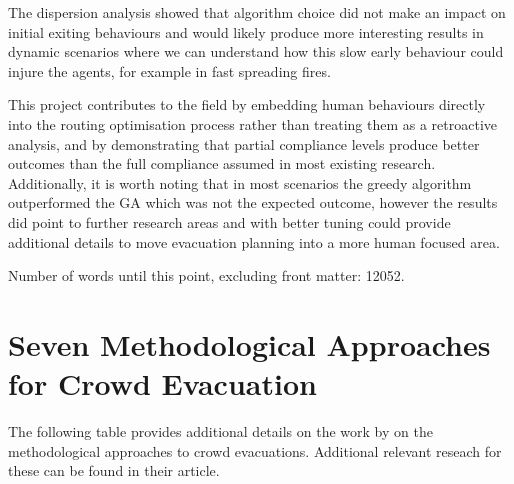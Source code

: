 \documentclass[12pt,a4paper]{report}
\begin{document}
The dispersion analysis showed that algorithm choice did not make an impact on initial exiting behaviours and would likely produce more interesting results in dynamic scenarios where we can understand how this slow early behaviour could injure the agents, for example in fast spreading fires. 

This project contributes to the field by embedding human behaviours directly into the routing optimisation process rather than treating them as a retroactive analysis, and by demonstrating that partial compliance levels produce better outcomes than the full compliance assumed in most existing research. Additionally, it is worth noting that in most scenarios the greedy algorithm outperformed the GA which was not the expected outcome, however the results did point to further research areas and with better tuning could provide additional details to move evacuation planning into a more human focused area. 


\vfill
Number of words until this point, excluding front matter: 12052.



\appendix


\chapter{Seven Methodological Approaches for Crowd Evacuation}
\label{chap:seven-methods}
The following table provides additional details on the work by \cite{ZHONG_2009_7_CROWD_BEHAVIOUR_MODELS} on the methodological approaches to crowd evacuations. Additional relevant reseach for these can be found in their article.
\end{document}
